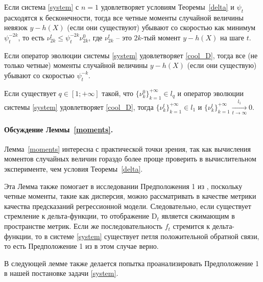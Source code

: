             \begin{lemma}[Веприков, 2023] \label{moments}
            Если система \eqref{system} с $n=1$ удовлетворяет условиям Теоремы~\ref{delta} и $\psi_t$ расходятся к бесконечности, тогда все четные моменты случайной величины невязок 
            $y - h(X)$ (если они существуют) убывают со скоростью как минимум $\psi_t^{-2k}$, то есть $\nu_{2k}^t \leq \psi_t^{-2k} \nu_{2k}^0$, где $\nu_{2k}^t$ -- это $2k$-тый момент $y - h(X)$ на шаге $t$.
    
            Если оператор эволюции системы \eqref{system} удовлетворяет \eqref{cool_D}, тогда все (не только четные) моменты случайной величины
            $y - h(X)$ (если они существую) убывают со скоростью $\psi_t^{-k}$.
    
            Если существует $q \in [1; +\infty]$ такой, что $\{\nu_k^0\}_{k=1}^{+\infty} \in l_q$ и оператор эволюции системы \eqref{system} удовлетворяет \eqref{cool_D}, тогда $\{\nu_k^t\}_{k=1}^{+\infty} \in l_1$ и $\{\nu_k^t\}_{k=1}^{+\infty} \underset{t \to \infty}{\overset{l_1}{\longrightarrow}} 0$.
        \end{lemma}
    
        \paragraph{Обсуждение Леммы~\ref{moments}.} Лемма~\ref{moments} интересна с практической точки зрения, так как вычисления моментов случайных величин гораздо более проще проверить в вычислительном эксперименте, чем условия Теоремы~\ref{delta}. 
    
        Эта Лемма также помогает в исследовании Предположения 1 из \citep{khritankov2021hidden}, поскольку четные моменты, такие как дисперсия, можно рассматривать в качестве метрики качества предсказаний регрессионной модели. Следовательно, если существует стремление к дельта-функции, то отображение $\text{D}_t$ является сжимающим в пространстве метрик. Если же последовательность $f_t$ стремится к дельта-функции, то в системе \eqref{system} существует петля положительной обратной связи, то есть Предположение 1 из \cite{khritankov2021hidden} в этом случае верно.
    
        В следующей лемме также делается попытка проанализировать Предположение 1 в нашей постановке задачи \eqref{system}.
    
